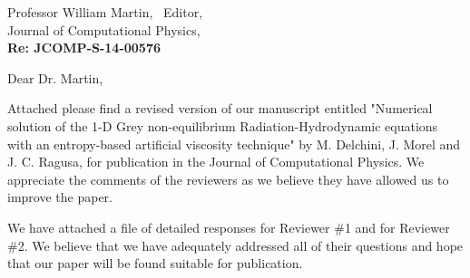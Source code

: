 \begin{letter}{Professor William Martin, \  Editor,\\
    Journal of Computational Physics,\\
\textbf{Re: JCOMP-S-14-00576}}


\date{\today}

\opening{Dear Dr. Martin,}
         \vspace{0.25cm}

Attached please find a revised version of our manuscript entitled
"Numerical solution of the 1-D Grey non-equilibrium Radiation-Hydrodynamic equations with an entropy-based artificial viscosity technique"
by M. Delchini, J. Morel and J. C. Ragusa, for
publication in the Journal of Computational Physics. We appreciate the comments of the reviewers as we
believe they have allowed us to improve the paper.

We have attached a file of detailed responses for Reviewer \#1 and for Reviewer \#2.
We believe that we have adequately addressed all of their questions and hope that our paper will be found suitable for publication.


\end{letter}
